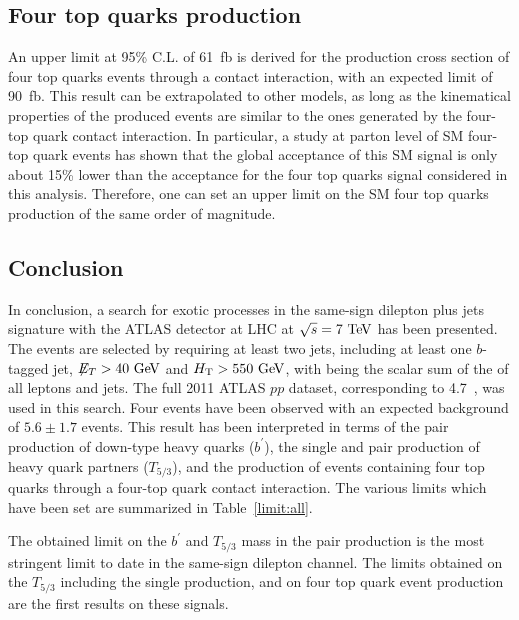 \subsection{Four top quarks production}
An upper limit
at 95\% C.L. of 61~fb is derived for the production cross section of four top quarks events
through a contact interaction, with an expected limit of 90~fb.
This result can be extrapolated to other models, as long as the kinematical properties of the 
produced events are similar to the ones generated by the four-top quark contact interaction. In
particular, a study at parton level of SM four-top quark events has shown that the
global acceptance of this SM signal is only about 15\% lower than the acceptance
for the four top quarks signal considered in this analysis. Therefore, one can set an upper limit on the
SM four top quarks production of the same order of magnitude.

\subsection{Conclusion}\label{sect:conclusion}
In conclusion, a search for exotic processes in the same-sign dilepton plus jets signature with the
ATLAS detector at LHC at $\sqrt{s}=7 \TeV$
has been presented. The events are selected by requiring at least two jets, including at
least one $b$-tagged jet, $\met>40 \GeV$ and $\HT>550 \GeV$, with \HT{} being the scalar sum of the \pT{}
of all leptons and jets. The full 2011 ATLAS $pp$ dataset,
corresponding to 4.7~\ifb{}, was used in this search. Four events have been observed with an expected
background of $5.6\pm1.7$ events. This result has been interpreted in terms of the pair production 
of down-type heavy quarks ($b^\prime$), the single and pair production of heavy quark partners
($T_{5/3}$), and the production of events containing four top quarks through a four-top quark
contact interaction. The various limits which have been set are summarized in Table~\ref{limit:all}.

The obtained limit on the $b^\prime$ and $T_{5/3}$ mass in the pair production is the most stringent 
limit to date in the same-sign dilepton channel. The limits obtained on the $T_{5/3}$ including the
single production, and on four top quark event production are the first results on these signals.


